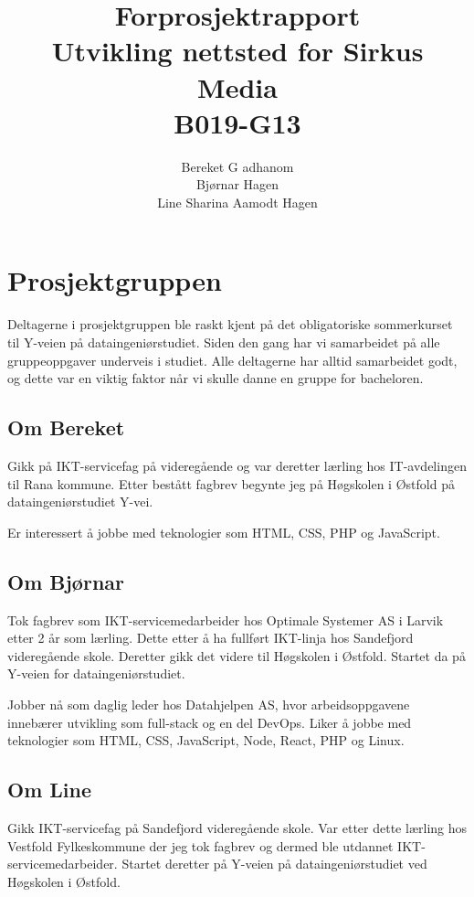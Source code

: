 \documentclass[11pt,a4paper]{report}
\begin{document}
\title{
\LARGE
Forprosjektrapport \\
\vspace{2cm}
Utvikling nettsted for Sirkus Media \\
\vspace{2cm}
\Huge
B019-G13
}
\author{
\LARGE 
Bereket G adhanom \\
\LARGE 
Bjørnar Hagen \\
\LARGE 
Line Sharina Aamodt Hagen
}
\maketitle

\section*{Prosjektgruppen}

Deltagerne i prosjektgruppen ble raskt kjent på det obligatoriske sommerkurset til Y-veien på dataingeniørstudiet. Siden den gang har vi samarbeidet på alle gruppeoppgaver underveis i studiet. Alle deltagerne har alltid samarbeidet godt, og dette var en viktig faktor når vi skulle danne en gruppe for bacheloren. 

\subsection*{Om Bereket}
Gikk på IKT-servicefag på  videregående og var deretter lærling hos IT-avdelingen til Rana kommune. Etter bestått fagbrev begynte jeg på Høgskolen i Østfold på dataingeniørstudiet Y-vei.

Er interessert å jobbe med teknologier som HTML, CSS, PHP og JavaScript.

\subsection*{Om Bjørnar}
Tok fagbrev som IKT-servicemedarbeider hos Optimale Systemer AS i Larvik etter 2 år som lærling. Dette etter å ha fullført IKT-linja hos Sandefjord videregående skole. Deretter gikk det videre til Høgskolen i Østfold. Startet da på Y-veien for dataingeniørstudiet.

Jobber nå som daglig leder hos Datahjelpen AS, hvor arbeidsoppgavene innebærer utvikling som full-stack og en del DevOps. Liker å jobbe med teknologier som HTML, CSS, JavaScript, Node, React, PHP og Linux.

\subsection*{Om Line}
Gikk IKT-servicefag på Sandefjord videregående skole. Var etter dette lærling hos Vestfold Fylkeskommune der jeg tok fagbrev og dermed ble utdannet IKT-servicemedarbeider. Startet deretter på Y-veien på dataingeniørstudiet ved Høgskolen i Østfold. 
\end{document}
